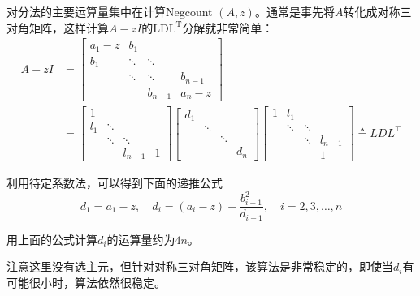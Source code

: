 \documentclass[12pt,a4paper]{article}
\begin{document}
对分法的主要运算量集中在计算Negcount $(A, z)$。通常是事先将$A$转化成对称三对角矩阵，这样计算$A-z I$的$\mathrm{LDL}^{\mathrm{T}}$分解就非常简单：
\begin{equation*}
	\begin{aligned}
		A-z I&=\left[\begin{array}{cccc}{a_{1}-z} & {b_{1}} & {} & {} \\ {b_{1}} & {\ddots} & {\ddots} & {} \\ {} & {\ddots} & {\ddots} & {b_{n-1}} \\ {} & {} & {b_{n-1}} & {a_{n}-z}\end{array}\right]
		\\
		&=\left[\begin{array}{cccc}{1} \\ {l_{1}} & {\ddots} & {} & {} \\ {} & {\ddots} & {\ddots} & {} \\ {} & {} & {l_{n-1}} & {1}\end{array}\right]\left[\begin{array}{cccc}{d_{1}} & {} & {}&  \\ {} & {\ddots} & {} & {} \\ {}  & {} & {\ddots} & {} \\ {} & {} & {}  & {d_{n}}\end{array}\right] \left[\begin{array}{cccc}{1} & {l_{1}} & {} & {} \\ {} & {\ddots} & {\ddots} & {}  \\ {} & {} & {\ddots} & {l_{n-1}} \\ {} & {} & {} & {1}\end{array}\right] \triangleq L D L^{\top}
	\end{aligned}
\end{equation*}

利用待定系数法，可以得到下面的递推公式
\begin{equation}
d_{1}=a_{1}-z, \quad d_{i}=\left(a_{i}-z\right)-\frac{b_{i-1}^{2}}{d_{i-1}}, \quad i=2,3, \ldots, n
\label{equation5.7}
\end{equation}

用上面的公式计算$d_i$的运算量约为$4n$。

注意这里没有选主元，但针对对称三对角矩阵，该算法是非常稳定的，即使当$d_i$有可能很小时，算法依然很稳定。
\end{document}
